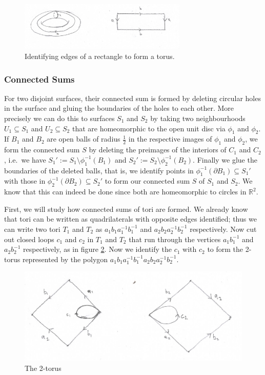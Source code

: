 \begin{figure}[htbp]
  \centering
  \includegraphics[width=8cm]{torus.png}
  \caption{Identifying edges of a rectangle to form a torus.}
  \label{fig:torus-rectangle}
\end{figure}

\subsubsection{Connected Sums}
\label{sec:surf:thm:cs}

For two disjoint surfaces, their connected sum is formed by deleting
circular holes in the surface and gluing the boundaries of the holes
to each other. More precisely we can do this to surfaces $S_1$ and
$S_2$ by taking two neighbourhoods $U_1 \subseteq S_1$ and $U_2
\subseteq S_2$ that are homeomorphic to the open unit disc via
$\phi_1$ and $\phi_2$. If $B_1$ and $B_2$ are open balls of radius
$\frac{1}{2}$ in the respective images of $\phi_1$ and $\phi_2$, we
form the connected sum $S$ by deleting the preimages of the interiors
of $C_1$ and $C_2$, i.e.\ we have $S_1' := S_1 \setminus
\phi_1^{-1}(B_1)$ and $S_2' := S_2 \setminus
\phi_2^{-1}(B_2)$. Finally we glue the boundaries of the deleted
balls, that is, we identify points in $\phi_1^{-1} (\partial B_1)
\subseteq S_1'$ with those in $\phi_2^{-1} (\partial B_2) \subseteq
S_2'$ to form our connected sum $S$ of $S_1$ and $S_2$. We know that
this can indeed be done since both are homeomorphic to circles in
$\mathbb{R}^2$.

First, we will study how connected sums of tori are formed. We already
know that tori can be written as quadrilaterals with opposite edges
identified; thus we can write  two tori $T_1$ and $T_2$ as
$a_1b_1a_1^{-1}b_1^{-1}$ and $a_2b_2a_2^{-1}b_2^{-1}$
respectively. Now cut out closed loops $c_1$ and $c_2$ in $T_1$ and
$T_2$ that run through the vertices  $a_1b_1^{-1}$ and $a_2b_2^{-1}$
respectively, as in figure \ref{fig:2-tori}. Now we identify the $c_1$
with $c_2$ to form the 2-torus represented by the polygon
$a_1b_1a_1^{-1}b_1^{-1}a_2b_2a_2^{-1}b_2^{-1}$.

\begin{figure}[htbp]
  \centering
  \includegraphics[width=12cm]{2torus.png}
  \caption{The 2-torus}
  \label{fig:2-tori}
\end{figure}

